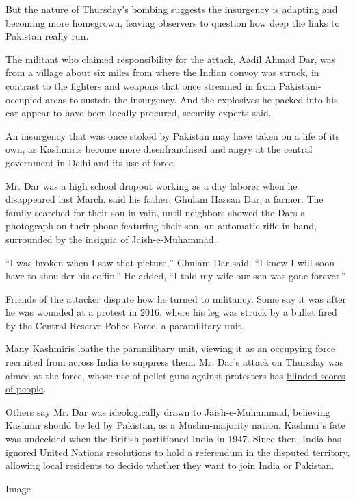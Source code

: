 But the nature of Thursday's bombing suggests the insurgency is adapting
and becoming more homegrown, leaving observers to question how deep the
links to Pakistan really run.

The militant who claimed responsibility for the attack, Aadil Ahmad Dar,
was from a village about six miles from where the Indian convoy was
struck, in contrast to the fighters and weapons that once streamed in
from Pakistani-occupied areas to sustain the insurgency. And the
explosives he packed into his car appear to have been locally procured,
security experts said.

An insurgency that was once stoked by Pakistan may have taken on a life
of its own, as Kashmiris become more disenfranchised and angry at the
central government in Delhi and its use of force.

Mr. Dar was a high school dropout working as a day laborer when he
disappeared last March, said his father, Ghulam Hassan Dar, a farmer.
The family searched for their son in vain, until neighbors showed the
Dars a photograph on their phone featuring their son, an automatic rifle
in hand, surrounded by the insignia of Jaish-e-Muhammad.

``I was broken when I saw that picture,'' Ghulam Dar said. ``I knew I
will soon have to shoulder his coffin.'' He added, ``I told my wife our
son was gone forever.''

Friends of the attacker dispute how he turned to militancy. Some say it
was after he was wounded at a protest in 2016, where his leg was struck
by a bullet fired by the Central Reserve Police Force, a paramilitary
unit.

Many Kashmiris loathe the paramilitary unit, viewing it as an occupying
force recruited from across India to suppress them. Mr. Dar's attack on
Thursday was aimed at the force, whose use of pellet guns against
protesters has
\href{https://www.nytimes.com/2016/08/29/world/asia/pellet-guns-used-in-kashmir-protests-cause-dead-eyes-epidemic.html}{blinded
scores of people}.

Others say Mr. Dar was ideologically drawn to Jaish-e-Muhammad,
believing Kashmir should be led by Pakistan, as a Muslim-majority
nation. Kashmir's fate was undecided when the British partitioned India
in 1947. Since then, India has ignored United Nations resolutions to
hold a referendum in the disputed territory, allowing local residents to
decide whether they want to join India or Pakistan.

Image

